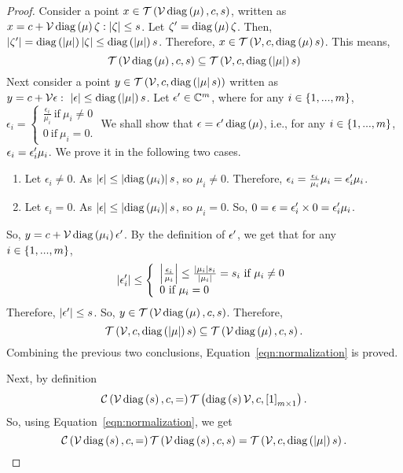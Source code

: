 \begin{proof}
Consider a point $x\in\mathit{\operatorname{\mathcal{T}}}\left(\mathcal{V}\operatorname{diag}\left(\mu\right),c,s\right)$,
written as
$x=c+\mathcal{V}\operatorname{diag}\left(\mu\right)\zeta:\left|\zeta\right|\leq s$.
Let $\zeta^\prime=\operatorname{diag}\left(\mu\right)\zeta$.  Then,
$\left|\zeta^\prime\right|=\operatorname{diag}\left(\left|\mu\right|\right)\left|\zeta\right|\leq\operatorname{diag}\left(\left|\mu\right|\right)s$.
Therefore, $x\in\mathit{\operatorname{\mathcal{T}}}\left(\mathcal{V},c,\operatorname{diag}\left(\mu\right)s\right)$.  This
means,
%
\[
\mathit{\operatorname{\mathcal{T}}}\left(\mathcal{V}\operatorname{diag}\left(\mu\right),c,s\right)\subseteq\mathit{\operatorname{\mathcal{T}}}\left(\mathcal{V},c,\operatorname{diag}\left(\left|\mu\right|\right)s\right)
\]
%
Next consider a point
$y\in\mathit{\operatorname{\mathcal{T}}}\left(\mathcal{V},c,\operatorname{diag}\left(\left|\mu\right|s\right)\right)$ written
as
$y=c+\mathcal{V}\epsilon:~\left|\epsilon\right|\leq \operatorname{diag}\left(\left|\mu\right|\right)s$.
Let $\epsilon^\prime\in\mathbb{C}^m$, where for any
$i\in\left\{1,...,m\right\}$,
%
$
\epsilon_i=\left\{
\begin{array}{l}
\frac{\epsilon_i}{\mu_i}~\text{if}~\mu_i\neq 0\\
0~\text{if}~\mu_i=0.
\end{array}
\right.
$
%
We shall show that $\epsilon=\epsilon^\prime\operatorname{diag}\left(\mu\right)$, i.e., for
any $i\in\left\{1,...,m\right\}$, $\epsilon_i=\epsilon^\prime_i\mu_i$.  We prove
it in the following two cases.
\begin{enumerate}
\item Let $\epsilon_i\neq 0$.  As
$\left|\epsilon\right|\leq\left|\operatorname{diag}\left(\mu_i\right)\right|s$, so
$\mu_i\neq 0$.  Therefore, $\epsilon_i=\frac{\epsilon_i}{\mu_i}\mu_i=\epsilon^\prime_i\mu_i$.
\item Let $\epsilon_i=0$.  As
$\left|\epsilon\right|\leq\left|\operatorname{diag}\left(\mu_i\right)\right|s$, so
$\mu_i= 0$.  So, $0=\epsilon=\epsilon^\prime_i\times
0=\epsilon^\prime_i\mu_i$.
\end{enumerate}
%
So, $y=c+\mathcal{V}\operatorname{diag}\left(\mu_i\right)\epsilon^\prime$.  By the definition of
$\epsilon^\prime$, we get that for any $i\in\left\{1,...,m\right\}$,
%
\[
\left|\epsilon^\prime_i\right|\leq
\left\{
\begin{array}{l}
\left|\frac{\epsilon_i}{\mu_i}\right|\leq\frac{\left|\mu_i\right|s_i}{\left|\mu_i\right|}=s_i~\text{if}~\mu_i\neq
0\\
0~\text{if}~\mu_i=0
\end{array}
\right.
\]
%
Therefore, $\left|\epsilon^\prime\right|\leq s$.  So,
$y\in\mathit{\operatorname{\mathcal{T}}}\left(\mathcal{V}\operatorname{diag}\left(\mu\right),c,s\right)$.  Therefore,
%
\[
\mathit{\operatorname{\mathcal{T}}}\left(\mathcal{V},c,\operatorname{diag}\left(\left|\mu\right|\right)s\right)\subseteq\mathit{\operatorname{\mathcal{T}}}\left(\mathcal{V}\operatorname{diag}\left(\mu\right),c,s\right).
\]
%
Combining the previous two conclusions,
Equation~\ref{eqn:normalization} is proved.

Next, by definition
%
\[
\mathit{\mathcal{C}}\left(\mathcal{V}\operatorname{diag}\left(s\right),c,=\right)\mathit{\operatorname{\mathcal{T}}}\left(\operatorname{diag}\left(s\right)\mathcal{V},c,\left[1\right]_{m\times 1}\right).
\]
%
So, using Equation~\ref{eqn:normalization}, we get
%
\[
\mathit{\mathcal{C}}\left(\mathcal{V}\operatorname{diag}\left(s\right),c,=\right)\mathit{\operatorname{\mathcal{T}}}\left(\mathcal{V}\operatorname{diag}\left(s\right),c,s\right)=\mathit{\operatorname{\mathcal{T}}}\left(\mathcal{V},c,\operatorname{diag}\left(\left|\mu\right|\right)s\right).
\]
%
\end{proof}
%
